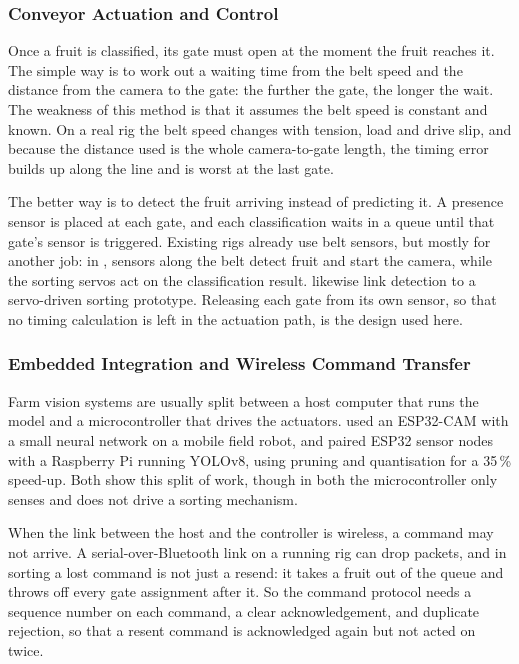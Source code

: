 \subsubsection{Conveyor Actuation and Control}
\label{sec:actuation}

Once a fruit is classified, its gate must open at the moment the fruit reaches it. The simple way is to work out a waiting time from the belt speed and the distance from the camera to the gate: the further the gate, the longer the wait. The weakness of this method is that it assumes the belt speed is constant and known. On a real rig the belt speed changes with tension, load and drive slip, and because the distance used is the whole camera-to-gate length, the timing error builds up along the line and is worst at the last gate.

The better way is to detect the fruit arriving instead of predicting it. A presence sensor is placed at each gate, and each classification waits in a queue until that gate's sensor is triggered. Existing rigs already use belt sensors, but mostly for another job: in \citet{moya2025}, sensors along the belt detect fruit and start the camera, while the sorting servos act on the classification result. \citet{geetha2025} likewise link detection to a servo-driven sorting prototype. Releasing each gate from its own sensor, so that no timing calculation is left in the actuation path, is the design used here.

\subsubsection{Embedded Integration and Wireless Command Transfer}
\label{sec:embedded}

Farm vision systems are usually split between a host computer that runs the model and a microcontroller that drives the actuators. \citet{patria2025} used an ESP32-CAM with a small neural network on a mobile field robot, and \citet{saxena2025} paired ESP32 sensor nodes with a Raspberry Pi running YOLOv8, using pruning and quantisation for a 35\,\% speed-up. Both show this split of work, though in both the microcontroller only senses and does not drive a sorting mechanism.

When the link between the host and the controller is wireless, a command may not arrive. A serial-over-Bluetooth link on a running rig can drop packets, and in sorting a lost command is not just a resend: it takes a fruit out of the queue and throws off every gate assignment after it. So the command protocol needs a sequence number on each command, a clear acknowledgement, and duplicate rejection, so that a resent command is acknowledged again but not acted on twice.

